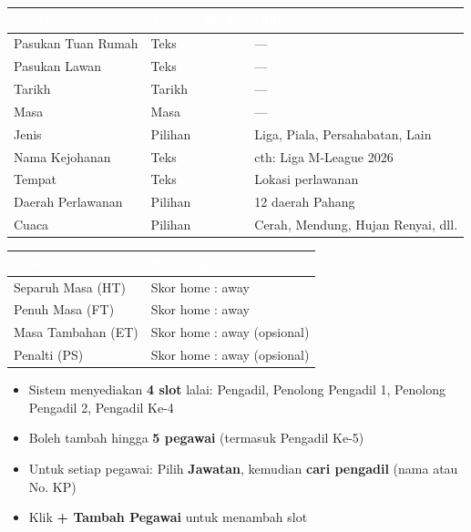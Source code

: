 \documentclass[12pt,a4paper]{report}
\newcommand{\tablemark}{\textcolor{successgreen}{\ding{51}}}
\newcommand{\tablecross}{\textcolor{dangered}{\ding{55}}}
\newcommand{\btn}[1]{\colorbox{primaryblue!10}{\textcolor{primaryblue}{\textbf{#1}}}}
\begin{document}
\begin{stepbox}
\begin{table}[H]
\centering
{}
\begin{tabularx}{\textwidth}{l l c X}
\toprule
\rowcolor{tableheader}
\textcolor{white}{\textbf{Medan}} & \textcolor{white}{\textbf{Jenis}} & \textcolor{white}{\textbf{Wajib}} & \textcolor{white}{\textbf{Pilihan}} \\
\midrule
Pasukan Tuan Rumah & Teks & \tablemark & --- \\
Pasukan Lawan & Teks & \tablemark & --- \\
Tarikh & Tarikh & \tablemark & --- \\
Masa & Masa & \tablecross & --- \\
Jenis & Pilihan & \tablecross & Liga, Piala, Persahabatan, Lain \\
Nama Kejohanan & Teks & \tablecross & cth: Liga M-League 2026 \\
Tempat & Teks & \tablecross & Lokasi perlawanan \\
Daerah Perlawanan & Pilihan & \tablemark & 12 daerah Pahang \\
Cuaca & Pilihan & \tablecross & Cerah, Mendung, Hujan Renyai, dll. \\
\bottomrule
\end{tabularx}
\end{table}
\end{stepbox}

\begin{stepbox}
\begin{table}[H]
\centering
{}
\begin{tabularx}{\textwidth}{l X}
\toprule
\rowcolor{tableheader}
\textcolor{white}{\textbf{Tempoh}} & \textcolor{white}{\textbf{Penerangan}} \\
\midrule
Separuh Masa (HT) & Skor home : away \\
Penuh Masa (FT) & Skor home : away \\
Masa Tambahan (ET) & Skor home : away (opsional) \\
Penalti (PS) & Skor home : away (opsional) \\
\bottomrule
\end{tabularx}
\end{table}
\end{stepbox}

\begin{stepbox}
\begin{itemize}[nosep]
  \item Sistem menyediakan \textbf{4 slot} lalai: Pengadil, Penolong Pengadil 1, Penolong Pengadil 2, Pengadil Ke-4
  \item Boleh tambah hingga \textbf{5 pegawai} (termasuk Pengadil Ke-5)
  \item Untuk setiap pegawai: Pilih \textbf{Jawatan}, kemudian \textbf{cari pengadil} (nama atau No. KP)
  \item Klik \btn{+ Tambah Pegawai} untuk menambah slot
\end{itemize}
\end{stepbox}
\end{document}
